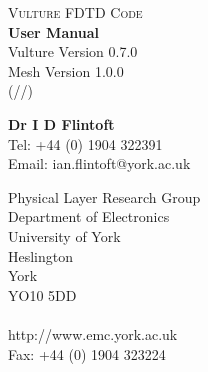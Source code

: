 \documentclass[onecolumn,a4paper]{article}
\numberwithin{equation}{section}
\begin{document}
%
%
\thispagestyle{empty}
\begin{flushright}
\vspace{5mm}
\begin{minipage}[t]{\linewidth}
\begin{center}
\end{center}
\end{minipage}  
\end{flushright}

\vspace{80mm}
\hspace{45mm}\begin{minipage}[t]{60mm}
\large
\begin{center}
  {\scshape Vulture FDTD Code}\\
  \vspace{4mm} 
  {\bf User Manual} \\
  \vspace{4mm} Vulture Version 0.7.0\\
               Mesh Version 1.0.0\\
               (\number\day/\number\month/\number\year)
\end{center}
\normalsize
\end{minipage}  

\vspace{20mm}
\begin{minipage}[t][100mm][b]{70mm}
{\large\bf Dr I D Flintoft}\\
Tel: +44 (0) 1904 322391\\
Email: ian.flintoft@york.ac.uk
\end{minipage}  
\hfill
\begin{minipage}[t][100mm][b]{52mm}
Physical Layer Research Group \\
Department of Electronics \\
University of York \\
Heslington \\
York \\
YO10 5DD \\
\\
http://www.emc.york.ac.uk \\
Fax: +44 (0) 1904 323224
\end{minipage}  
\newpage
\thispagestyle{empty}
%
%
%
%
\end{document}
